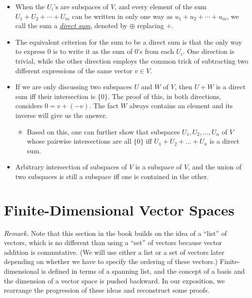 \documentclass{article}
\newcommand{\df}[1]{\ul{\textit{#1}}}
\begin{document}
\begin{itemize}
    \item When the $U_i$'s are subspaces of $V$, and every element of the sum $U_1 + U_2 +\cdots+ U_m$ can be written in only one way as $u_1+u_2+\cdots+u_m$, we call the sum a \df{direct sum}, denoted by $\oplus$ replacing $+$.
    \item The equivalent criterion for the sum to be a direct sum is that the only way to express $0$ is to write it as the sum of $0$'s from each $U_i$. One direction is trivial, while the other direction employs the common trick of subtracting two different expressions of the same vector $v \in V$.
    \item If we are only discussing two subspaces $U$ and $W$ of $V$, then $U+W$ is a direct sum iff their intersection is $\{0\}$. The proof of this, in both directions, considers $0 = v + (-v)$. The fact $W$ always contains an element and its inverse will give us the answer.
    \begin{itemize}
    	\item Based on this, one can further show that subspaces $U_1,U_2,\dots,U_n$ of $V$ whose pairwise intersections are all $\{0\}$ iff $U_1 + U_2 + \dots + U_n$ is a direct sum.
    \end{itemize}
    \item Arbitrary intersection of subspaces of $V$ is a subspace of $V$, and the union of two subspaces is still a subspace iff one is contained in the other.
\end{itemize}


\newpage
\section{Finite-Dimensional Vector Spaces}

\textit{Remark.} Note that this section in the book builds on the idea of a ``list'' of vectors, which is no different than using a ``set'' of vectors because vector addition is commutative. (We will use either a list or a set of vectors later depending on whether we have to specify the ordering of these vectors.) Finite-dimensional is defined in terms of a spanning list, and the concept of a basis and the dimension of a vector space is pushed backward. In our exposition, we rearrange the progression of these ideas and reconstruct some proofs.
\end{document}
